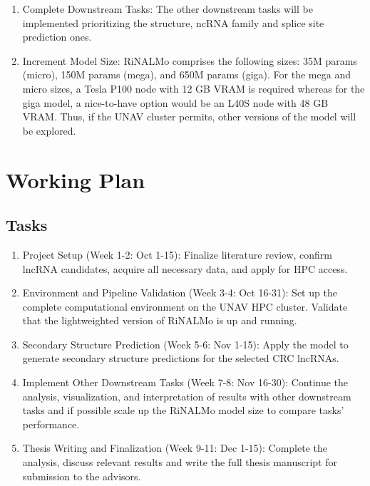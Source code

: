\documentclass[ENG]{TFUOC}%
\begin{document}
\begin{itemize}
\begin{enumerate}
        \item Complete Downstream Tasks: The other downstream tasks will be implemented prioritizing the structure, ncRNA family and splice site prediction ones. 
        \item Increment Model Size: RiNALMo comprises the following sizes: 35M params (micro), 150M params (mega), and 650M params (giga). For the mega and micro sizes, a Tesla P100 node with 12 GB VRAM is required whereas for the giga model, a nice-to-have option would be an L40S node with 48 GB VRAM. Thus, if the UNAV cluster permits, other versions of the model will be explored. 
    \end{enumerate}

\end{itemize}


\section{Working Plan}

\subsection{Tasks}

\begin{enumerate}
    \item Project Setup (Week 1-2: Oct 1-15): Finalize literature review, confirm lncRNA candidates, acquire all necessary data, and apply for HPC access.
    \item Environment and Pipeline Validation (Week 3-4: Oct 16-31): Set up the complete computational environment on the UNAV HPC cluster. Validate that the lightweighted version of RiNALMo is up and running. 
    \item Secondary Structure Prediction (Week 5-6: Nov 1-15): Apply the model to generate secondary structure predictions for the selected CRC lncRNAs. 
    \item Implement Other Downstream Tasks  (Week 7-8: Nov 16-30): Continue the analysis, visualization, and interpretation of results with other downstream tasks and if possible scale up the RiNALMo model size to compare tasks’ performance. 
    \item Thesis Writing and Finalization (Week 9-11: Dec 1-15): Complete the analysis, discuss relevant results and write the full thesis manuscript for submission to the advisors.
    
\end{enumerate}
\end{document}
